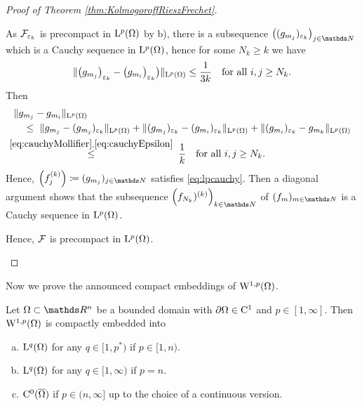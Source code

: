 \begin{proof}[Proof of Theorem \ref{thm:KolmogoroffRieszFrechet}]
\begin{enumerate}[I)]
\begin{enumerate}[a)]
\begin{equation}
        \end{equation}
        As $\mathcal{F}_{\varepsilon_k}$ is precompact in $\mathrm{L}^p(\Omega)$ by b), there is a subsequence $\big((g_{m_j})_{\varepsilon_k}\big)_{j \in \N}$ which is a Cauchy sequence in $\mathrm{L}^p(\Omega)$, hence for some $N_k \geq k$ we have
        \begin{equation}
          \label{eq:cauchyEpsilon}
          \| \big( g_{m_j} \big)_{\varepsilon_k} - \big( g_{m_i} \big)_{\varepsilon_k} \big) \|_{\mathrm{L}^p(\Omega)} \leq \frac{1}{3k} \quad\text{for all } i,j \geq N_k.
        \end{equation}
        Then
        \begin{align*}
          &\|g_{m_j} - g_{m_i}\|_{\mathrm{L}^p(\Omega)} \\
          &\quad \leq \
          \|g_{m_j} - (g_{m_j})_{\varepsilon_k} \|_{\mathrm{L}^p(\Omega)}
          + \|(g_{m_j})_{\varepsilon_k} - (g_{m_i})_{\varepsilon_k} \|_{\mathrm{L}^p(\Omega)}
          + \|(g_{m_i})_{\varepsilon_k} - g_{m_k} \|_{\mathrm{L}^p(\Omega)} \\
          &\hspace{-1.7em}\quad\overset{\eqref{eq:cauchyMollifier},\eqref{eq:cauchyEpsilon}}\leq \; \frac{1}{k} \quad\text{for all } i,j \geq N_k.
        \end{align*}
        Hence, $\Big( f_j^{(k)} \Big) \coloneqq (g_{m_j})_{j \in \N}$ satisfies \eqref{eq:lpcauchy}.
        Then a diagonal argument shows that the subsequence $\Big(f_{N_k})^{(k)} \Big)_{k \in \N}$ of $(f_m)_{m \in \N}$ is a Cauchy sequence in $\mathrm{L}^p(\Omega)$.

        Hence, $\mathcal{F}$ is precompact in $\mathrm{L}^p(\Omega)$. \qedhere
    \end{enumerate}
  \end{enumerate}
\end{proof}

Now we prove the announced compact embeddings of $\mathrm{W}^{1,p}(\Omega)$.

\begin{thm}
  \label{thm:RellichKondrachov}
  Let $\Omega \subset \R^n$ be a bounded domain with $\partial\Omega \in \mathrm{C}^1$ and $p \in [1,\infty]$.
  Then $\mathrm{W}^{1,p}(\Omega)$ is compactly embedded into
  \begin{enumerate}[a)]
    \item $\mathrm{L}^q(\Omega)$ for any $q \in [1,p^*)$ if $p \in [1,n)$.
    \item $\mathrm{L}^q(\Omega)$ for any $q \in [1,\infty)$ if $p = n$.
    \item $\mathrm{C}^0(\overline\Omega)$ if $p \in (n,\infty]$ up to the choice of a continuous version.
  \end{enumerate}
\end{thm}

